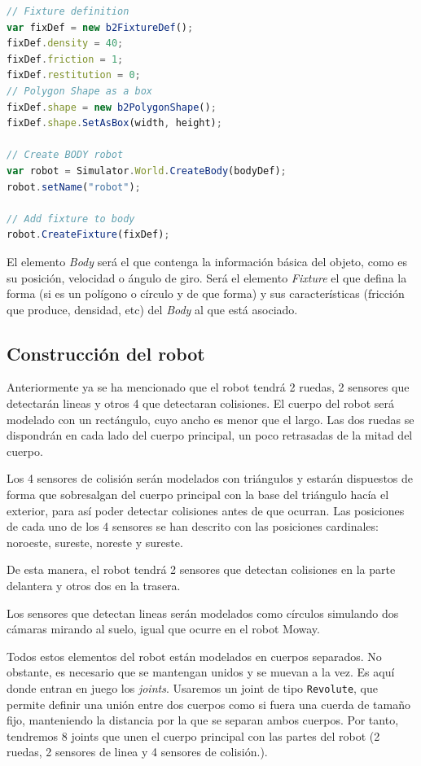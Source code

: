 {\begin{lstlisting}[language={Javascript},label={code:ejemplo-factoria}, caption={Creación del cuerpo principal del robot utilizando la librería Box2dweb.}]
// Fixture definition
var fixDef = new b2FixtureDef(); 
fixDef.density = 40;
fixDef.friction = 1;
fixDef.restitution = 0;
// Polygon Shape as a box
fixDef.shape = new b2PolygonShape(); 
fixDef.shape.SetAsBox(width, height);

// Create BODY robot
var robot = Simulator.World.CreateBody(bodyDef);
robot.setName("robot");

// Add fixture to body
robot.CreateFixture(fixDef);
\end{lstlisting}


El elemento \emph{Body} será el que contenga la información básica del objeto, como es su posición, velocidad o ángulo de giro. Será el elemento \emph{Fixture} el que defina la forma (si es un polígono o círculo y de que forma) y sus características (fricción que produce, densidad, etc) del \emph{Body} al que está asociado.


\subsection{Construcción del robot}
\label{sec:contruccion-robot}


Anteriormente ya se ha mencionado que el robot tendrá 2 ruedas, 2 sensores que detectarán lineas y otros 4 que detectaran colisiones. El cuerpo del robot será modelado con un rectángulo, cuyo ancho es menor que el largo. Las dos ruedas se dispondrán en cada lado del cuerpo principal, un poco retrasadas de la mitad del cuerpo.

Los 4 sensores de colisión serán modelados con triángulos y estarán dispuestos de forma que sobresalgan del cuerpo principal con la base del triángulo hacía el exterior, para así poder detectar colisiones antes de que ocurran. Las posiciones de cada uno de los 4 sensores se han descrito con las posiciones cardinales: noroeste, sureste, noreste y sureste. 

De esta manera, el robot tendrá 2 sensores que detectan colisiones en la parte delantera y otros dos en la trasera. 

Los sensores que detectan lineas serán modelados como círculos simulando dos cámaras mirando al suelo, igual que ocurre en el robot Moway. 

Todos estos elementos del robot están modelados en cuerpos separados. No obstante, es necesario que se mantengan unidos y se muevan a la vez. Es aquí donde entran en juego los \emph{joints}. Usaremos un joint de tipo \texttt{Revolute}, que permite definir una unión entre dos cuerpos como si fuera una cuerda de tamaño fijo, manteniendo la distancia por la que se separan ambos cuerpos. Por tanto, tendremos 8 joints que unen el cuerpo principal con las partes del robot (2 ruedas, 2 sensores de linea y 4 sensores de colisión.).
 
}
